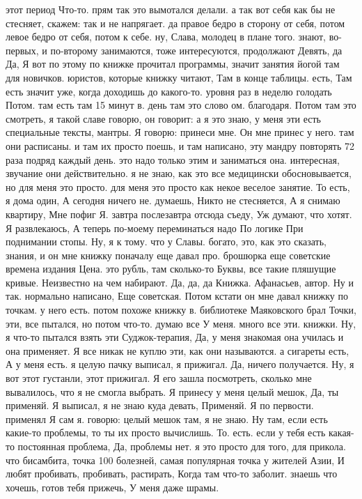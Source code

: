 этот период Что-то.
прям так это вымотался делали.
а так вот себя как бы не стесняет, скажем:
так и не напрягает. да правое бедро в сторону от себя, потом левое бедро от себя, потом к себе. ну, Слава, молодец в плане того.
знают, во-первых, и по-второму занимаются, тоже интересуются, продолжают Девять, да Да, Я вот по этому по книжке прочитал программы, значит занятия йогой там для новичков.
юристов, которые книжку читают, Там в конце таблицы.
есть, Там есть значит уже, когда доходишь до какого-то.
уровня раз в неделю голодать Потом.
там есть там 15 минут в.
день там это слово ом.
благодаря.
Потом там это смотреть, я такой славе говорю, он говорит: а я это знаю, у меня эти есть специальные тексты, мантры.
Я говорю: принеси мне.
Он мне принес у него. там они расписаны.
и там их просто поешь, и там написано, эту мандру повторять 72 раза подряд каждый день. это надо только этим и заниматься она. интересная, звучание они действительно. я не знаю, как это все медицински обосновывается, но для меня это просто.
для меня это просто как некое веселое занятие. То есть, я дома один,
А сегодня ничего не.
думаешь, Никто не стесняется, А я снимаю квартиру, Мне пофиг Я.
завтра послезавтра отсюда съеду, Уж думают, что хотят. Я развлекаюсь, А теперь по-моему переминаться надо По логике При поднимании стопы. Ну, я к тому.
что у Славы.
богато, это, как это сказать, знания, и он мне книжку поначалу еще давал про.
брошюрка еще советские времена издания Цена.
это рубль, там сколько-то Буквы, все такие пляшущие кривые.
Неизвестно на чем набирают.
Да, да, да Книжка.
Афанасьев, автор. Ну и так.
нормально написано, Еще советская. Потом кстати он мне давал книжку по точкам. у него есть.
потом похоже книжку в.
библиотеке Маяковского брал Точки, эти, все пытался, но потом что-то.
думаю все У меня.
много все эти.
книжки. Ну, я что-то пытался взять эти Суджок-терапия, Да, у меня знакомая она училась и она применяет. Я все никак не куплю эти, как они называются.
а сигареты есть, А у меня есть. я целую пачку выписал, я прижигал.
Да, ничего получается. Ну, я вот этот густанли, этот прижигал. Я его зашла посмотреть, сколько мне вывалилось, что я не смогла выбрать. Я принесу у меня целый мешок, Да, ты применяй. Я выписал, я не знаю куда девать, Применяй.
Я по первости.
применял Я сам я.
говорю: целый мешок там, я не знаю.
Ну там, если есть какие-то проблемы, то ты их просто вычислишь. То.
есть. если у тебя есть какая-то постоянная проблема, Да, проблемы нет. я это просто для того, для прикола.
что бисамбита, точка 100 болезней, самая популярная точка у жителей Азии, И любят пробивать, пробивать, растирать, Когда там что-то заболит. знаешь что хочешь, готов тебя прижечь, У меня даже шрамы.
